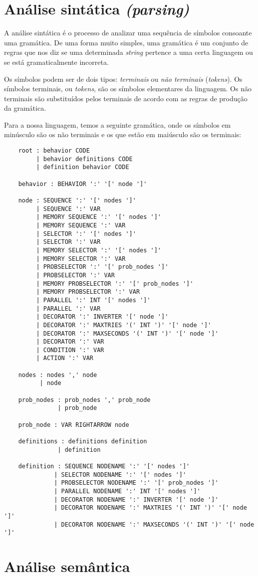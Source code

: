 \section{Análise sintática \textit{(parsing)}}
A análise sintática é o processo de analizar uma sequência de símbolos consoante uma gramática.
De uma forma muito simples, uma gramática é um conjunto de regras que nos diz se uma determinada \textit{string} pertence a uma certa linguagem ou se está gramaticalmente incorreta.

Os símbolos podem ser de dois tipos: \textit{terminais} ou \textit{não terminais} (\textit{tokens}).
Os símbolos terminais, ou \textit{tokens}, são os símbolos elementares da linguagem.
Os não terminais são substituídos pelos terminais de acordo com as regras de produção da gramática.

Para a nossa linguagem, temos a seguinte gramática, onde os símbolos em minúsculo são os não terminais e os que estão em maiúsculo são os terminais:

\begin{lstlisting}
    root : behavior CODE
         | behavior definitions CODE
         | definition behavior CODE

    behavior : BEHAVIOR ':' '[' node ']'

    node : SEQUENCE ':' '[' nodes ']'
         | SEQUENCE ':' VAR
         | MEMORY SEQUENCE ':' '[' nodes ']'
         | MEMORY SEQUENCE ':' VAR
         | SELECTOR ':' '[' nodes ']'
         | SELECTOR ':' VAR
         | MEMORY SELECTOR ':' '[' nodes ']'
         | MEMORY SELECTOR ':' VAR
         | PROBSELECTOR ':' '[' prob_nodes ']'
         | PROBSELECTOR ':' VAR
         | MEMORY PROBSELECTOR ':' '[' prob_nodes ']'
         | MEMORY PROBSELECTOR ':' VAR
         | PARALLEL ':' INT '[' nodes ']'
         | PARALLEL ':' VAR
         | DECORATOR ':' INVERTER '[' node ']'
         | DECORATOR ':' MAXTRIES '(' INT ')' '[' node ']'
         | DECORATOR ':' MAXSECONDS '(' INT ')' '[' node ']'
         | DECORATOR ':' VAR
         | CONDITION ':' VAR
         | ACTION ':' VAR
    
    nodes : nodes ',' node
          | node
    
    prob_nodes : prob_nodes ',' prob_node
               | prob_node
    
    prob_node : VAR RIGHTARROW node

    definitions : definitions definition
               | definition

    definition : SEQUENCE NODENAME ':' '[' nodes ']'
              | SELECTOR NODENAME ':' '[' nodes ']'
              | PROBSELECTOR NODENAME ':' '[' prob_nodes ']'
              | PARALLEL NODENAME ':' INT '[' nodes ']'
              | DECORATOR NODENAME ':' INVERTER '[' node ']'
              | DECORATOR NODENAME ':' MAXTRIES '(' INT ')' '[' node ']'
              | DECORATOR NODENAME ':' MAXSECONDS '(' INT ')' '[' node ']'
\end{lstlisting}


\section{Análise semântica}
